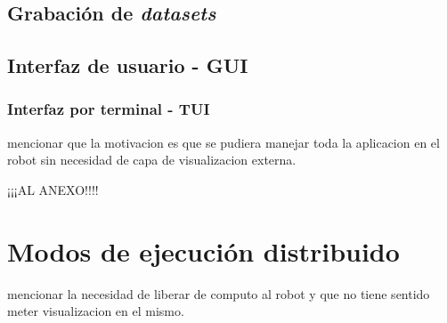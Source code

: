 \subsection{Grabación de \textit{datasets}}
\label{sec:redata}


\subsection{Interfaz de usuario - GUI}
\label{sec:ui}

\subsubsection{Interfaz por terminal - TUI}
mencionar que la motivacion es que se pudiera manejar toda la aplicacion en el robot sin necesidad de capa de visualizacion externa.

¡¡¡AL ANEXO!!!!



\section{Modos de ejecución distribuido}
\label{sec:headless}

mencionar la necesidad de liberar de computo al robot y que no tiene sentido meter visualizacion en el mismo.